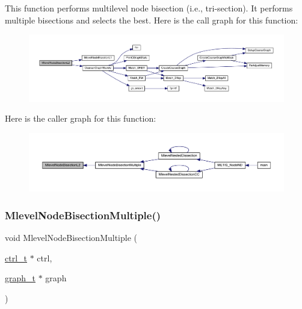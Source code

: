 This function performs multilevel node bisection (i.\+e., tri-\/section). It performs multiple bisections and selects the best. Here is the call graph for this function\+:\nopagebreak
\begin{figure}[H]
\begin{center}
\leavevmode
\includegraphics[width=350pt]{a00933_ac3a0eaeefa34a3865a0be5bb70bd958f_cgraph}
\end{center}
\end{figure}
Here is the caller graph for this function\+:\nopagebreak
\begin{figure}[H]
\begin{center}
\leavevmode
\includegraphics[width=350pt]{a00933_ac3a0eaeefa34a3865a0be5bb70bd958f_icgraph}
\end{center}
\end{figure}
\mbox{\label{a00933_a59c8030c5429e219a8535c2a11cef724}} 
\subsubsection{\texorpdfstring{Mlevel\+Node\+Bisection\+Multiple()}{MlevelNodeBisectionMultiple()}}
{\footnotesize\ttfamily void Mlevel\+Node\+Bisection\+Multiple (\begin{DoxyParamCaption}\item[{\hyperlink{a00742}{ctrl\+\_\+t} $\ast$}]{ctrl,  }\item[{\hyperlink{a00734}{graph\+\_\+t} $\ast$}]{graph }\end{DoxyParamCaption})}


